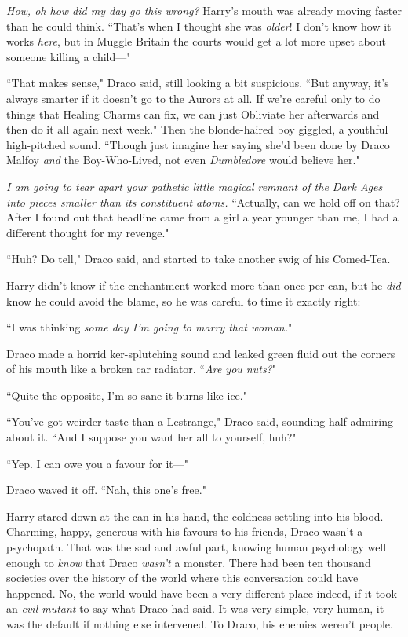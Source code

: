 \emph{How, oh how did my day go this wrong?} Harry's mouth was already moving faster than he could think. ``That's when I thought she was \emph{older}! I don't know how it works \emph{here}, but in Muggle Britain the courts would get a lot more upset about someone killing a child—"

``That makes sense," Draco said, still looking a bit suspicious. ``But anyway, it's always smarter if it doesn't go to the Aurors at all. If we're careful only to do things that Healing Charms can fix, we can just Obliviate her afterwards and then do it all again next week." Then the blonde-haired boy giggled, a youthful high-pitched sound. ``Though just imagine her saying she'd been done by Draco Malfoy \emph{and} the Boy-Who-Lived, not even \emph{Dumbledore} would believe her."

\emph{I am going to tear apart your pathetic little magical remnant of the Dark Ages into pieces smaller than its constituent atoms.} ``Actually, can we hold off on that? After I found out that headline came from a girl a year younger than me, I had a different thought for my revenge."

``Huh? Do tell," Draco said, and started to take another swig of his Comed-Tea.

Harry didn't know if the enchantment worked more than once per can, but he \emph{did} know he could avoid the blame, so he was careful to time it exactly right:

``I was thinking \emph{some day I'm going to marry that woman.}"

Draco made a horrid ker-splutching sound and leaked green fluid out the corners of his mouth like a broken car radiator. ``\emph{Are you nuts?}"

``Quite the opposite, I'm so sane it burns like ice."

``You've got weirder taste than a Lestrange," Draco said, sounding half-admiring about it. ``And I suppose you want her all to yourself, huh?"

``Yep. I can owe you a favour for it—"

Draco waved it off. ``Nah, this one's free."

Harry stared down at the can in his hand, the coldness settling into his blood. Charming, happy, generous with his favours to his friends, Draco wasn't a psychopath. That was the sad and awful part, knowing human psychology well enough to \emph{know} that Draco \emph{wasn't} a monster. There had been ten thousand societies over the history of the world where this conversation could have happened. No, the world would have been a very different place indeed, if it took an \emph{evil mutant} to say what Draco had said. It was very simple, very human, it was the default if nothing else intervened. To Draco, his enemies weren't people.

